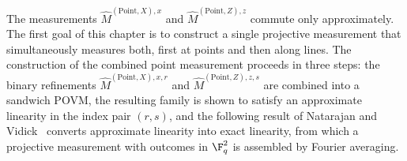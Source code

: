 The measurements $\hat{M}^{(\mathrm{Point},X),x}$ and
$\hat{M}^{(\mathrm{Point},Z),z}$ commute only approximately. The first goal of
this chapter is to construct a single projective measurement that
simultaneously measures both, first at points and then along lines. The
construction of the combined point measurement proceeds in three steps: the
binary refinements $\hat{M}^{(\mathrm{Point},X),x,r}$ and
$\hat{M}^{(\mathrm{Point},Z),z,s}$ are combined into a sandwich POVM, the
resulting family is shown to satisfy an approximate linearity in the index
pair $(r,s)$, and the following result of Natarajan and
Vidick~\cite{Natarajan2017Linearity} converts approximate linearity into exact
linearity, from which a projective measurement with outcomes in $\F_q^2$ is
assembled by Fourier averaging.

